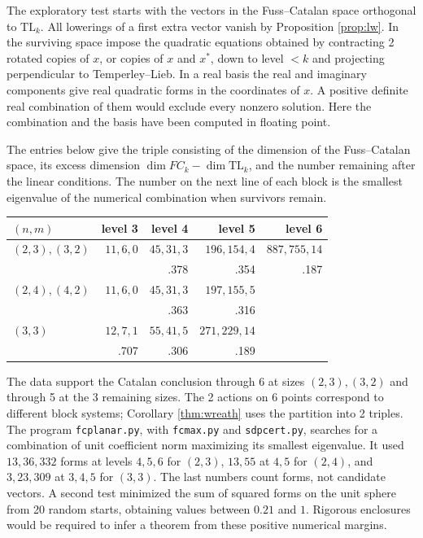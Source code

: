 \documentclass[11pt,a4paper]{amsart}
\newcommand{\TL}{\mathrm{TL}}
\begin{document}
The exploratory test starts with the vectors in the Fuss--Catalan space orthogonal to $\TL_k$. All lowerings of a first extra vector vanish by Proposition \ref{prop:lw}. In the surviving space impose the quadratic equations obtained by contracting 2 rotated copies of $x$, or copies of $x$ and $x^*$, down to level $<k$ and projecting perpendicular to Temperley--Lieb. In a real basis the real and imaginary components give real quadratic forms in the coordinates of $x$. A positive definite real combination of them would exclude every nonzero solution. Here the combination and the basis have been computed in floating point.

The entries below give the triple consisting of the dimension of the Fuss--Catalan space, its excess dimension $\dim FC_k-\dim\TL_k$, and the number remaining after the linear conditions. The number on the next line of each block is the smallest eigenvalue of the numerical combination when survivors remain.
\begin{center}\small
\begin{tabular}{lrrrr}
\toprule
$(n,m)$ & level 3 & level 4 & level 5 & level 6\\ \midrule
$(2,3),(3,2)$ & $11,6,0$ & $45,31,3$ & $196,154,4$ & $887,755,14$\\
 & & .378 & .354 & .187\\[2pt]
$(2,4),(4,2)$ & $11,6,0$ & $45,31,3$ & $197,155,5$ & \\
 & & .363 & .316 & \\[2pt]
$(3,3)$ & $12,7,1$ & $55,41,5$ & $271,229,14$ & \\
 & .707 & .306 & .189 & \\ \bottomrule
\end{tabular}
\end{center}
The data support the Catalan conclusion through 6 at sizes $(2,3),(3,2)$ and through 5 at the 3 remaining sizes. The 2 actions on 6 points correspond to different block systems; Corollary \ref{thm:wreath} uses the partition into 2 triples. The program \texttt{fcplanar.py}, with \texttt{fcmax.py} and \texttt{sdpcert.py}, searches for a combination of unit coefficient norm maximizing its smallest eigenvalue. It used $13,36,332$ forms at levels $4,5,6$ for $(2,3)$, $13,55$ at $4,5$ for $(2,4)$, and $3,23,309$ at $3,4,5$ for $(3,3)$. The last numbers count forms, not candidate vectors. A second test minimized the sum of squared forms on the unit sphere from 20 random starts, obtaining values between $0.21$ and $1$. Rigorous enclosures would be required to infer a theorem from these positive numerical margins.
\end{document}
